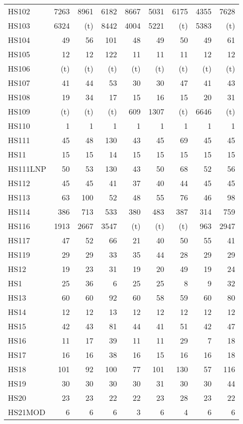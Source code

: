 \documentclass[11pt,twoside]{article}
\begin{document}
{\begin{longtable}[c]{|l|r|r|r|r|r|r|r|r|}
 HS102 & 7263 & 8961 & 6182 & 8667 & 5031 & 6175 & 4355 & 7628 \\
 HS103 & 6324 & (t) & 8442 & 4004 & 5221 & (t) & 5383 & (t) \\
 HS104 & 49 & 56 & 101 & 48 & 49 & 50 & 49 & 61 \\
 HS105 & 12 & 12 & 122 & 11 & 11 & 11 & 12 & 12 \\
 HS106 & (t) & (t) & (t) & (t) & (t) & (t) & (t) & (t) \\
 HS107 & 41 & 44 & 53 & 30 & 30 & 47 & 41 & 43 \\
 HS108 & 19 & 34 & 17 & 15 & 16 & 15 & 20 & 31 \\
 HS109 & (t) & (t) & (t) & 609 & 1307 & (t) & 6646 & (t) \\
 HS110 & 1 & 1 & 1 & 1 & 1 & 1 & 1 & 1 \\
 HS111 & 45 & 48 & 130 & 43 & 45 & 69 & 45 & 45 \\
 HS11 & 15 & 15 & 14 & 15 & 15 & 15 & 15 & 15 \\
 HS111LNP & 50 & 53 & 130 & 43 & 50 & 68 & 52 & 56 \\
 HS112 & 45 & 45 & 41 & 37 & 40 & 44 & 45 & 45 \\
 HS113 & 63 & 100 & 52 & 48 & 55 & 76 & 46 & 98 \\
 HS114 & 386 & 713 & 533 & 380 & 483 & 387 & 314 & 759 \\
 HS116 & 1913 & 2667 & 3547 & (t) & (t) & (t) & 963 & 2947 \\
 HS117 & 47 & 52 & 66 & 21 & 40 & 50 & 55 & 41 \\
 HS119 & 29 & 29 & 33 & 35 & 44 & 28 & 29 & 29 \\
 HS12 & 19 & 23 & 31 & 19 & 20 & 49 & 19 & 24 \\
 HS1 & 25 & 36 & 6 & 25 & 25 & 8 & 9 & 32 \\
 HS13 & 60 & 60 & 92 & 60 & 58 & 59 & 60 & 80 \\
 HS14 & 12 & 12 & 13 & 12 & 12 & 12 & 12 & 12 \\
 HS15 & 42 & 43 & 81 & 44 & 41 & 51 & 42 & 47 \\
 HS16 & 11 & 17 & 39 & 11 & 11 & 29 & 7 & 18 \\
 HS17 & 16 & 16 & 38 & 16 & 15 & 16 & 16 & 18 \\
 HS18 & 101 & 92 & 100 & 77 & 101 & 130 & 57 & 116 \\
 HS19 & 30 & 30 & 30 & 30 & 31 & 30 & 30 & 44 \\
 HS20 & 23 & 23 & 22 & 22 & 23 & 28 & 23 & 22 \\
 HS21MOD & 6 & 6 & 6 & 3 & 6 & 4 & 6 & 6 \\

\end{longtable}}
\end{document}
